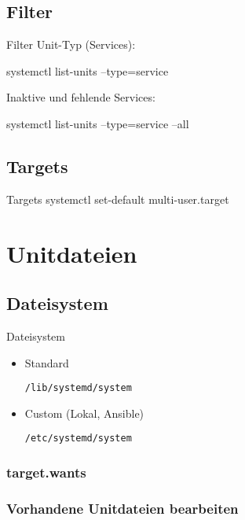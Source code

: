 \subsection{Filter}

\begin{frame}{Filter}
Unit-Typ (Services):

    systemctl list-units --type=service

Inaktive und fehlende Services:

    systemctl list-units --type=service --all  
\end{frame}
  
\subsection{Targets}

\begin{frame}{Targets}
 systemctl set-default multi-user.target
\end{frame}

\section{Unitdateien}

\subsection{Dateisystem}

\begin{frame}[fragile]{Dateisystem}
  \begin{itemize}
\item Standard

	\verb|/lib/systemd/system|
\item Custom (Lokal, Ansible)

	\verb|/etc/systemd/system|
\end{itemize}
\end{frame}

\subsubsection{target.wants}

\subsubsection{Vorhandene Unitdateien bearbeiten}


